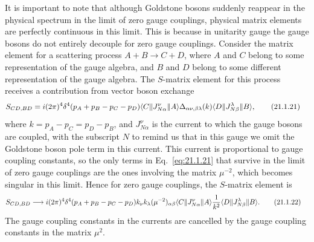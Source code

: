 It is important to note that although Goldstone bosons suddenly reappear in
the physical spectrum in the limit of zero gauge couplings, physical matrix
elements are perfectly continuous in this limit. This is because in
unitarity gauge the gauge bosons do not entirely decouple for zero gauge
couplings. Consider the matrix element for a scattering process
$A+B\to C+D$, where $A$ and $C$ belong to some representation of the gauge
algebra, and $B$ and $D$ belong to some different representation of the
gauge algebra. The $S$-matrix element for this process receives a
contribution from vector boson exchange
\begin{align}
 S_{CD,BD}={}&i(2\pi)^4
 \delta^4(p_A+p_B-p_C-p_D)
 \langle C\rVert J_{N\alpha}^{\nu}\lVert A\rangle
 \Delta_{\alpha\nu,\beta\lambda}(k)
 \langle D\rVert J_{N\beta}^{\lambda}\lVert B\rangle,
 \tag{21.1.21}\label{eq:21.1.21}
\end{align}
where $k=p_A-p_C=p_D-p_B$, and $J_{N\alpha}^{\nu}$ is the current to which
the gauge bosons are coupled, with the subscript $N$ to remind us that in
this gauge we omit the Goldstone boson pole term in this current. This
current is proportional to gauge coupling constants, so the only terms in
Eq.~\eqref{eq:21.1.21} that survive in the limit of zero gauge couplings are
the ones involving the matrix $\mu^{-2}$, which becomes singular in this
limit. Hence for zero gauge couplings, the $S$-matrix element is
\begin{align}
 S_{CD,BD}\longrightarrow{}&
 i(2\pi)^4\delta^4(p_A+p_B-p_C-p_D)
 k_\nu k_\lambda(\mu^{-2})_{\alpha\beta}
 \langle C\rVert J_{N\alpha}^{\nu}\lVert A\rangle
 \frac1{k^2}
 \langle D\rVert J_{N\beta}^{\lambda}\lVert B\rangle.
 \tag{21.1.22}\label{eq:21.1.22}
\end{align}
The gauge coupling constants in the currents are cancelled by the gauge
coupling constants in the matrix $\mu^2$.

